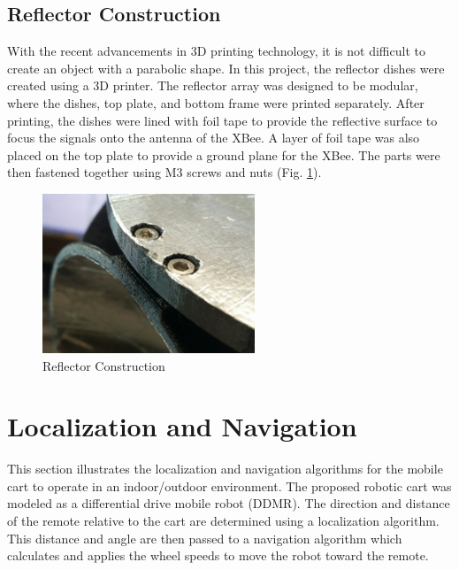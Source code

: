 \subsection{Reflector Construction}
With the recent advancements in 3D printing technology, it is not difficult to
create an object with a parabolic shape. In this project, the reflector dishes
were created using a 3D printer. The reflector array was designed to be modular,
where the dishes, top plate, and bottom frame were printed separately. After
printing, the dishes were lined with foil tape to provide the reflective surface
to focus the signals onto the antenna of the XBee. A layer of foil tape was also
placed on the top plate to provide a ground plane for the XBee. The parts were
then fastened together using M3 screws and nuts (Fig.
\ref{fig:reflectorConstruction}).
%
\begin{figure}[H]
    \centering
    \includegraphics[width=2.5in]{figs/img/reflectorConstruction.jpg}
    \caption{Reflector Construction}
    \label{fig:reflectorConstruction}
\end{figure}

\section{Localization and Navigation}\label{sec:locAndNavAlgos}

This section illustrates the localization and navigation algorithms for the mobile cart to operate in an indoor/outdoor environment. The proposed robotic cart was modeled as a differential drive mobile robot (DDMR). The direction and distance of the remote relative to the cart are determined using a localization algorithm. This distance and angle are then passed to a navigation algorithm which calculates and applies the wheel speeds to move the robot toward the remote.


